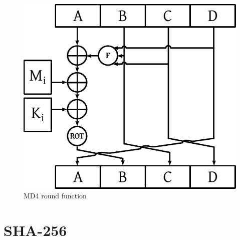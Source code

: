 \begin{figure}[t]
  \begin{center}
    \includegraphics{img/md4.pdf}
    \caption{MD4 round function}
    \label{fig:md4-round-function}
  \end{center}
\end{figure}

\section{SHA-256}
\label{sec:dc-sha-256}


